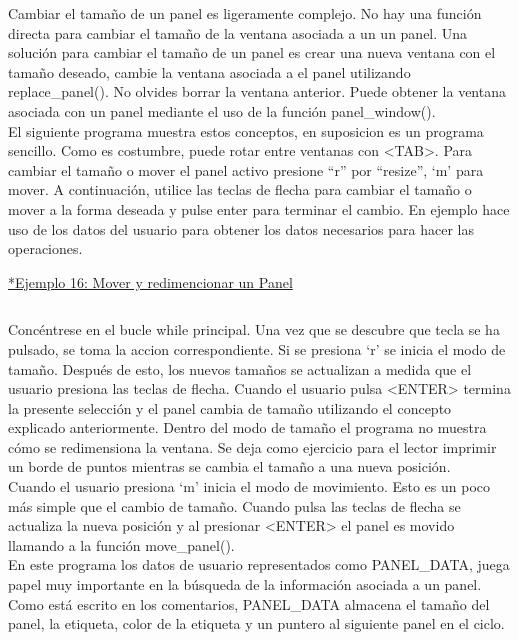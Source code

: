 \documentclass{article}
\begin{document}
Cambiar el tamaño de un panel es ligeramente complejo. No hay una función
directa para cambiar el tamaño de la ventana asociada a un un panel. Una
solución para cambiar el tamaño de un panel es crear una nueva ventana con el
tamaño deseado, cambie la ventana asociada a el panel utilizando
replace\_panel(). No olvides borrar la ventana anterior. Puede obtener la
ventana asociada con un panel mediante el uso de la función panel\_window().\\

El siguiente programa muestra estos conceptos, en suposicion es un programa
sencillo. Como es costumbre, puede rotar entre ventanas con <TAB>. Para cambiar
el tamaño o mover el panel activo presione “r” por “resize”, ‘m’ para mover. A
continuación, utilice las teclas de flecha para cambiar el tamaño o mover a la
forma deseada y pulse enter para terminar el cambio. En ejemplo hace uso de los
datos del usuario para obtener los datos necesarios para hacer las operaciones.

\href{https://github.com/nasciiboy/NCURSES-Programming-HOWTO/blob/master/ncurses_programs/panels/panel_resize.c}{*Ejemplo 16: Mover y redimencionar un Panel}
\inputminted{cpp}{./cpp/016_mover_redimencionar_panel.cpp}

Concéntrese en el bucle while principal. Una vez que se descubre que tecla se
ha pulsado, se toma la accion correspondiente. Si se presiona ‘r’ se inicia el
modo de tamaño. Después de esto, los nuevos tamaños se actualizan a medida que
el usuario presiona las teclas de flecha. Cuando el usuario pulsa <ENTER>
termina la presente selección y el panel cambia de tamaño utilizando el
concepto explicado anteriormente. Dentro del modo de tamaño el programa no
muestra cómo se redimensiona la ventana. Se deja como ejercicio para el lector
imprimir un borde de puntos mientras se cambia el tamaño a una nueva posición.\\

Cuando el usuario presiona ‘m’ inicia el modo de movimiento. Esto es un poco
más simple que el cambio de tamaño. Cuando pulsa las teclas de flecha se
actualiza la nueva posición y al presionar <ENTER> el panel es movido llamando
a la función move\_panel().\\

En este programa los datos de usuario representados como PANEL\_DATA, juega
papel muy importante en la búsqueda de la información asociada a un panel. Como
está escrito en los comentarios, PANEL\_DATA almacena el tamaño del panel, la
etiqueta, color de la etiqueta y un puntero al siguiente panel en el ciclo.
\end{document}
